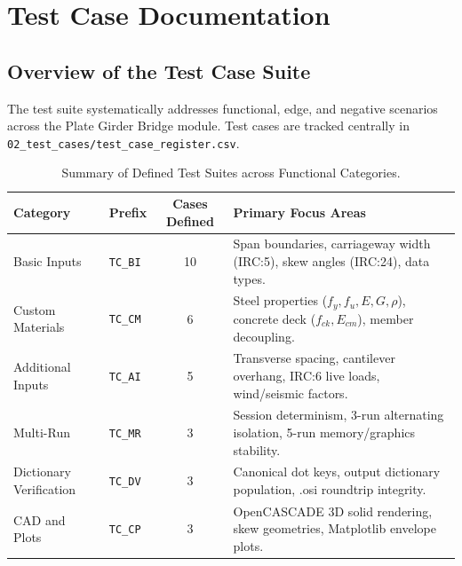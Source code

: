 \chapter{Test Case Documentation}
\label{chap:test_cases}

\section{Overview of the Test Case Suite}
The test suite systematically addresses functional, edge, and negative scenarios across the Plate Girder Bridge module. Test cases are tracked centrally in \texttt{02\_test\_cases/test\_case\_register.csv}.

\begin{table}[htbp]
    \centering
    \small
    \caption{Summary of Defined Test Suites across Functional Categories.}
    \label{tab:test_suite_summary}
    \begin{tabularx}{\textwidth}{llcX}
        \toprule
        \textbf{Category} & \textbf{Prefix} & \textbf{Cases Defined} & \textbf{Primary Focus Areas} \\
        \midrule
        Basic Inputs & \texttt{TC\_BI} & 10 & Span boundaries, carriageway width (IRC:5), skew angles (IRC:24), data types. \\
        Custom Materials & \texttt{TC\_CM} & 6 & Steel properties ($f_y, f_u, E, G, \rho$), concrete deck ($f_{ck}, E_{cm}$), member decoupling. \\
        Additional Inputs & \texttt{TC\_AI} & 5 & Transverse spacing, cantilever overhang, IRC:6 live loads, wind/seismic factors. \\
        Multi-Run & \texttt{TC\_MR} & 3 & Session determinism, 3-run alternating isolation, 5-run memory/graphics stability. \\
        Dictionary Verification & \texttt{TC\_DV} & 3 & Canonical dot keys, output dictionary population, .osi roundtrip integrity. \\
        CAD and Plots & \texttt{TC\_CP} & 3 & OpenCASCADE 3D solid rendering, skew geometries, Matplotlib envelope plots. \\
        \bottomrule
    \end{tabularx}
\end{table}

